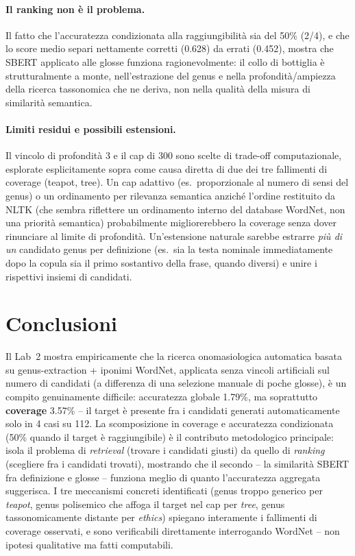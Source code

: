 \documentclass[12pt,a4paper]{article}
\begin{document}
\paragraph{Il ranking non \`e il problema.} Il fatto che l'accuratezza condizionata alla raggiungibilit\`a sia del 50\% (2/4), e che lo score medio separi nettamente corretti (0.628) da errati (0.452), mostra che SBERT applicato alle glosse funziona ragionevolmente: il collo di bottiglia \`e strutturalmente a monte, nell'estrazione del genus e nella profondit\`a/ampiezza della ricerca tassonomica che ne deriva, non nella qualit\`a della misura di similarit\`a semantica.

\paragraph{Limiti residui e possibili estensioni.} Il vincolo di profondit\`a 3 e il cap di 300 sono scelte di trade-off computazionale, esplorate esplicitamente sopra come causa diretta di due dei tre fallimenti di coverage (teapot, tree). Un cap adattivo (es.\ proporzionale al numero di sensi del genus) o un ordinamento per rilevanza semantica anzich\'e l'ordine restituito da NLTK (che sembra riflettere un ordinamento interno del database WordNet, non una priorit\`a semantica) probabilmente migliorerebbero la coverage senza dover rinunciare al limite di profondit\`a. Un'estensione naturale sarebbe estrarre \emph{pi\`u di un} candidato genus per definizione (es.\ sia la testa nominale immediatamente dopo la copula sia il primo sostantivo della frase, quando diversi) e unire i rispettivi insiemi di candidati.

\section{Conclusioni}

Il Lab~2 mostra empiricamente che la ricerca onomasiologica automatica basata su genus-extraction + iponimi WordNet, applicata senza vincoli artificiali sul numero di candidati (a differenza di una selezione manuale di poche glosse), \`e un compito genuinamente difficile: accuratezza globale 1.79\%, ma soprattutto \textbf{coverage} 3.57\% -- il target \`e presente fra i candidati generati automaticamente solo in 4 casi su 112. La scomposizione in coverage e accuratezza condizionata (50\% quando il target \`e raggiungibile) \`e il contributo metodologico principale: isola il problema di \emph{retrieval} (trovare i candidati giusti) da quello di \emph{ranking} (scegliere fra i candidati trovati), mostrando che il secondo -- la similarit\`a SBERT fra definizione e glosse -- funziona meglio di quanto l'accuratezza aggregata suggerisca. I tre meccanismi concreti identificati (genus troppo generico per \textit{teapot}, genus polisemico che affoga il target nel cap per \textit{tree}, genus tassonomicamente distante per \textit{ethics}) spiegano interamente i fallimenti di coverage osservati, e sono verificabili direttamente interrogando WordNet -- non ipotesi qualitative ma fatti computabili.
\end{document}
